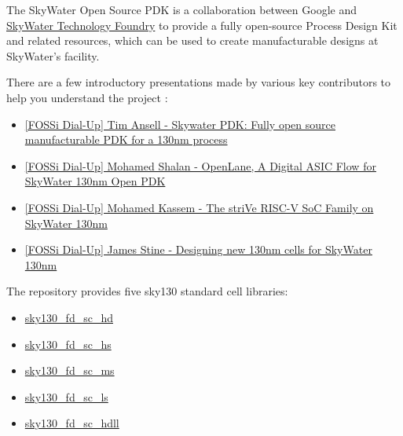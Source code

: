 \documentclass[a4paper,12pt,twoside]{article}
\begin{document}
The SkyWater Open Source PDK is a collaboration between Google and \href{https://www.skywatertechnology.com/}{SkyWater Technology Foundry} to provide a fully open-source Process Design Kit and related resources, which can be used to create manufacturable designs at SkyWater’s facility.

There are a few introductory presentations made by various key contributors to help you understand the project \cite{cs250lab1}:
\begin{itemize}
    \item \href{https://www.youtube.com/watch?v=EczW2IWdnOM}{[FOSSi Dial-Up] Tim Ansell - Skywater PDK: Fully open source manufacturable PDK for a 130nm process}
    \item \href{https://www.youtube.com/watch?v=Vhyv0eq_mLU}{[FOSSi Dial-Up] Mohamed Shalan - OpenLane, A Digital ASIC Flow for SkyWater 130nm Open PDK}
    \item \href{https://www.youtube.com/watch?v=HvWveK2fZt0}{[FOSSi Dial-Up] Mohamed Kassem - The striVe RISC-V SoC Family on SkyWater 130nm}
    \item \href{https://www.youtube.com/watch?v=Svus4uQ_CAA}{[FOSSi Dial-Up] James Stine - Designing new 130nm cells for SkyWater 130nm}
\end{itemize}
The repository provides five sky130 standard cell libraries:
\begin{itemize}
    \item \href{https://github.com/The-OpenROAD-Project/openlane/blob/master/regression_results/benchmark_results/SW_HD.csv}{sky130\_fd\_sc\_hd}
    \item \href{https://github.com/The-OpenROAD-Project/openlane/blob/master/regression_results/benchmark_results/SW_HS.csv}{sky130\_fd\_sc\_hs}
    \item \href{https://github.com/The-OpenROAD-Project/openlane/blob/master/regression_results/benchmark_results/SW_MS.csv}{sky130\_fd\_sc\_ms}
    \item \href{https://github.com/The-OpenROAD-Project/openlane/blob/master/regression_results/benchmark_results/SW_LS.csv}{sky130\_fd\_sc\_ls}
    \item \href{https://github.com/The-OpenROAD-Project/openlane/blob/master/regression_results/benchmark_results/SW_HDLL.csv}{sky130\_fd\_sc\_hdll}
\end{itemize}
\end{document}
